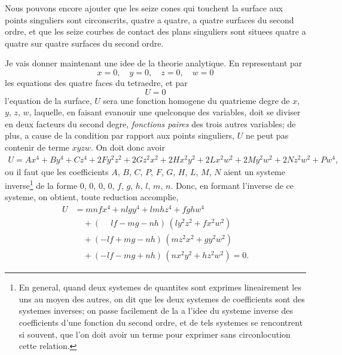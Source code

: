 \documentclass[11pt,a4paper]{book}
\begin{document}
Nous pouvons encore ajouter que les seize cones qui touchent la surface aux points singuliers sont circonscrits, quatre a quatre, a quatre surfaces du second ordre, et que les seize courbes de contact des plans singuliers sont situees quatre a quatre sur quatre surfaces du second ordre.

Je vais donner maintenant une idee de la theorie analytique. En representant par
\[
x = 0,\quad y = 0,\quad z = 0,\quad w = 0
\]
les equations des quatre faces du tetraedre, et par
\[
U = 0
\]
l'equation de la surface, $U$ sera une fonction homogene du quatrieme degre de $x$, $y$, $z$, $w$, laquelle, en faisant evanouir une quelconque des variables, doit se diviser en deux facteurs du second degre, \textit{fonctions paires} des trois autres variables; de plus, a cause de la condition par rapport aux points singuliers, $U$ ne peut pas contenir de terme $xyzw$. On doit donc avoir
\begin{multline*}
U = Ax^4 + By^4 + Cz^4 + 2Fy^2z^2 + 2Gz^2x^2 + 2Hx^2y^2 + 2Lx^2w^2 + 2My^2w^2 + 2Nz^2w^2 + Pw^4,
\end{multline*}
ou il faut que les coefficients $A$, $B$, $C$, $P$, $F$, $G$, $H$, $L$, $M$, $N$ aient un systeme inverse\footnote{En general, quand deux systemes de quantites sont exprimes lineairement les uns au moyen des autres, on dit que les deux systemes de coefficients sont des systemes inverses; on passe facilement de la a l'idee du systeme inverse des coefficients d'une fonction du second ordre, et de tels systemes se rencontrent si souvent, que l'on doit avoir un terme pour exprimer sans circonlocution cette relation.} de la forme $0$, $0$, $0$, $0$, $f$, $g$, $h$, $l$, $m$, $n$. Donc, en formant l'inverse de ce systeme, on obtient, toute reduction accomplie,
\begin{align*}
U &= mnfx^4 + nlgy^4 + lmhz^4 + fghw^4 \\
  &\quad + (\phantom{-}lf - mg - nh)\,(ly^2z^2 + fx^2w^2) \\
  &\quad + (-lf + mg - nh)\,(mz^2x^2 + gy^2w^2) \\
  &\quad + (-lf - mg + nh)\,(nx^2y^2 + hz^2w^2) = 0.
\end{align*}
\end{document}
